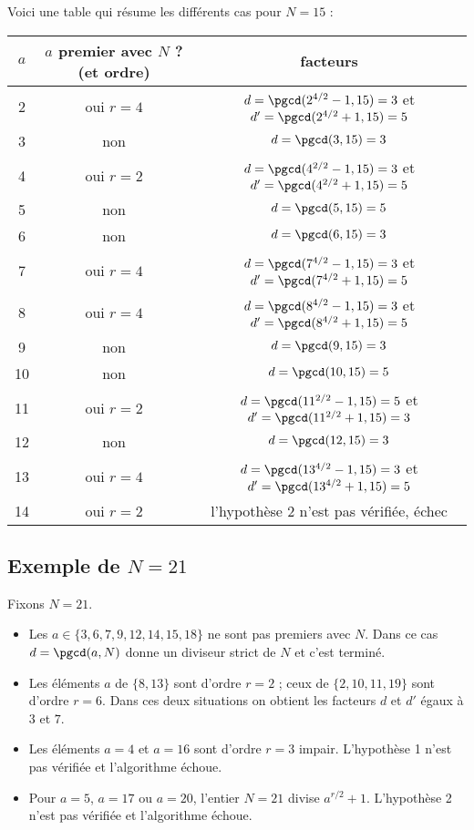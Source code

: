 \documentclass[11pt,class=report,crop=false]{standalone}
\begin{document}
\bigskip
Voici une table qui résume les différents cas pour $N=15$ :
\begin{center}
\begin{tabular}{c|c|c}
$a$ & $a$ premier avec $N$ ? (et ordre) & facteurs \\ \hline
2 & oui \quad $r=4$ & $d=\pgcd(2^{4/2}-1,15)=3$ et $d'=\pgcd(2^{4/2}+1,15)=5$ \\
3 & non             & $d=\pgcd(3,15)=3$ \\
4 & oui \quad $r=2$ & $d=\pgcd(4^{2/2}-1,15)=3$ et $d'=\pgcd(4^{2/2}+1,15)=5$ \\
5 & non             & $d=\pgcd(5,15)=5$ \\ 
6 & non             & $d=\pgcd(6,15)=3$ \\ 
7 & oui \quad $r=4$ & $d=\pgcd(7^{4/2}-1,15)=3$ et $d'=\pgcd(7^{4/2}+1,15)=5$ \\
8 & oui \quad $r=4$ & $d=\pgcd(8^{4/2}-1,15)=3$ et $d'=\pgcd(8^{4/2}+1,15)=5$ \\
9 & non             & $d=\pgcd(9,15)=3$ \\ 
10 & non             & $d=\pgcd(10,15)=5$ \\
11 & oui \quad $r=2$ & $d=\pgcd(11^{2/2}-1,15)=5$ et $d'=\pgcd(11^{2/2}+1,15)=3$ \\
12 & non             & $d=\pgcd(12,15)=3$ \\
13 & oui \quad $r=4$ & $d=\pgcd(13^{4/2}-1,15)=3$ et $d'=\pgcd(13^{4/2}+1,15)=5$ \\
14 & oui \quad $r=2$ & l'hypothèse 2 n'est pas vérifiée, échec \\
\end{tabular}
\end{center}

\subsection{Exemple de $N=21$}

Fixons $N=21$.

\begin{itemize}
  \item Les $a \in \{3,6,7,9,12,14,15,18\}$ 
	ne sont pas premiers avec $N$. Dans ce cas $d = \pgcd(a,N)$ donne un diviseur strict de $N$ et c'est terminé.

  \item Les éléments $a$ de $\{8,13\}$ sont d'ordre $r=2$ ;
  ceux de $\{2,10,11,19\}$ sont d'ordre $r=6$. Dans ces deux situations on obtient les facteurs $d$ et $d'$ égaux à $3$ et $7$.

  \item Les éléments $a=4$ et $a=16$ sont d'ordre $r=3$ impair. L'hypothèse 1 n'est pas vérifiée et l'algorithme échoue.
  
  \item Pour $a=5$, $a=17$ ou $a=20$, l'entier $N=21$ divise $a^{r/2}+1$. L'hypothèse 2 n'est pas vérifiée et l'algorithme échoue.
\end{itemize}
\end{document}
